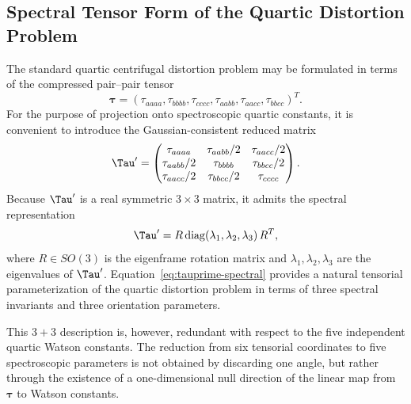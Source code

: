 \subsection{Spectral Tensor Form of the Quartic Distortion Problem}

The standard quartic centrifugal distortion problem may be formulated in terms
of the compressed pair--pair tensor
\begin{equation}
\boldsymbol{\tau}=
(\tau_{aaaa},\tau_{bbbb},\tau_{cccc},\tau_{aabb},\tau_{aacc},\tau_{bbcc})^T .
\end{equation}
For the purpose of projection onto spectroscopic quartic constants, it is
convenient to introduce the Gaussian-consistent reduced matrix
\begin{equation}
\Tau'=
\begin{pmatrix}
\tau_{aaaa} & \tau_{aabb}/2 & \tau_{aacc}/2 \\
\tau_{aabb}/2 & \tau_{bbbb} & \tau_{bbcc}/2 \\
\tau_{aacc}/2 & \tau_{bbcc}/2 & \tau_{cccc}
\end{pmatrix}.
\label{eq:tauprime-matrix}
\end{equation}
Because $\Tau'$ is a real symmetric $3\times 3$ matrix, it admits the spectral
representation
\begin{equation}
\Tau' = R \,\mathrm{diag}(\lambda_1,\lambda_2,\lambda_3)\, R^T,
\label{eq:tauprime-spectral}
\end{equation}
where $R\in SO(3)$ is the eigenframe rotation matrix and
$\lambda_1,\lambda_2,\lambda_3$ are the eigenvalues of $\Tau'$.
Equation~\eqref{eq:tauprime-spectral} provides a natural tensorial
parameterization of the quartic distortion problem in terms of three spectral
invariants and three orientation parameters.

This $3+3$ description is, however, redundant with respect to the five
independent quartic Watson constants.  The reduction from six tensorial
coordinates to five spectroscopic parameters is not obtained by discarding one
angle, but rather through the existence of a one-dimensional null direction of
the linear map from $\boldsymbol{\tau}$ to Watson constants.

